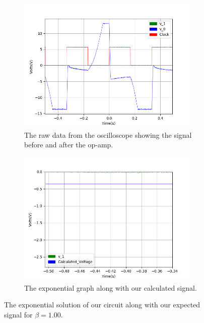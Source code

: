 \begin{figure}[h!]
\centering
\begin{subfigure}[t]{.475\textwidth}
  \centering
  \includegraphics[width=0.95\textwidth, height=0.22\textheight]{figures/Exponential/scope_31raw.png}
  \caption{The raw data from the oscilloscope showing the signal before and after the op-amp.}
 \label{fig:Exp_10_raw}
\end{subfigure}\hfill
\begin{subfigure}[t]{.475\textwidth}
  \centering
  \includegraphics[width=0.95\textwidth, height=0.22\textheight]{figures/Exponential/scope_31_calc.png}
  \caption{The exponential graph along with our calculated signal.}
\label{fig:Exp_10_calc}
\end{subfigure}
\caption{The exponential solution of our circuit along with our expected signal for $\beta = 1.00$.}
\label{fig:Exp_10}
\end{figure}

